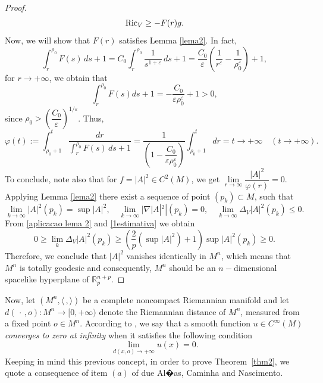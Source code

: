 \documentclass[leqno,11pt]{amsart}
\theoremstyle{plain}
\theoremstyle{definition}
\numberwithin{equation}{section}
\begin{document}
\begin{proof}
\begin{equation}
{\rm Ric}_V \geq - F(r) g.
\end{equation}
Now, we will show that $F(r)$ satisfies Lemma \ref{lema2}. In fact, 
$$
\int_r^{\rho_0} F(s)\,ds + 1 
= C_0 \int_r^{\rho_0} \frac{1}{s^{1+\varepsilon}}\,ds + 1 
= \frac{C_0}{\varepsilon} \left( \frac{1}{r^{\varepsilon}} - \frac{1}{\rho_0^{\varepsilon}} \right) + 1,
$$
for $r \longrightarrow + \infty$, we obtain that
$$
\int_r^{\rho_0} F(s)ds + 1 = - \dfrac{C_0}{\varepsilon \rho_0^\varepsilon} + 1 > 0,
$$
since $\rho_0 > \left( \dfrac{C_0}{\varepsilon}  \right)^{1/\varepsilon}$. Thus, 
$$
\varphi(t) := \int_{\rho_0 + 1}^t \frac{dr}{\displaystyle\int_{r}^{\rho_0} F(s) \, ds + 1} = \dfrac{1}{ \left( 1 - \dfrac{C_0}{\varepsilon \rho_0^\varepsilon} \right) } \int_{\rho_0 + 1}^t dr = t  \to +\infty \quad (t \to +\infty).
$$
To conclude, note also that for $f = |A|^2 \in C^2(M)$, we get $
\lim\limits_{r \to \infty}\dfrac{|A|^2}{\varphi(r)} = 0.$ Applying Lemma \ref{lema2} there exist a sequence of point $(p_k) \subset M$, such that 
\begin{equation}\label{aplicacao lema 2}
	\lim_{k \to \infty} |A|^2(p_k) = \sup |A|^2, \quad \lim_{k \to \infty} |\nabla |A|^2|(p_k) = 0, \quad \lim_{k \to \infty} \Delta_V |A|^2(p_k) \leq 0.
\end{equation}
From \eqref{aplicacao lema 2} and \eqref{1estimativa} we obtain
$$
0 \geq \lim_{k} \Delta_V |A|^2(p_k) \geq \left( \dfrac{2}{p}(\sup |A|^2) + 1 \right) \sup |A|^2 (p_k) \geq 0.
$$
Therefore, we conclude that $|A|^2$ vanishes identically in $M^n$, which means that $M^n$ is totally geodesic and consequently, $M^n$ should be an $n-$dimensional spacelike hyperplane of $\mathbb{R}^{n+p}_p$.


\end{proof}

Now, let $(M^n,\langle\,,\rangle)$ be a complete noncompact Riemannian manifold and let $d(\,\cdot\,,o):M^n\rightarrow[0,+\infty)$ denote the Riemannian distance of $M^n$, measured from a fixed point $o\in M^n$. According to \cite[Section 2]{Alias-Caminha-Nascimento:2019}, we say that a smooth function $u\in C^{\infty}(M)$ {\em converges to zero at infinity} when it satisfies the following condition
\begin{equation}\label{distance condition}
	\lim_{d(x,o)\rightarrow+\infty}u(x)=0.
\end{equation}
Keeping in mind this previous concept, in order to prove Theorem~\ref{thm2}, we quote a consequence of item $(a)$ of \cite[Theorem $2.2$]{Alias-Caminha-Nascimento:2019} due Al�as, Caminha and Nascimento.
\end{document}
